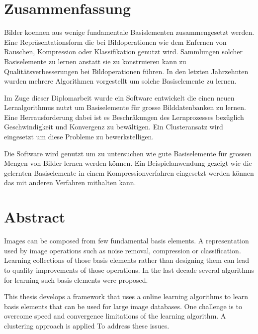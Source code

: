 \newpage
{}
{}
\chapter*{Zusammenfassung}
\thispagestyle{empty}

Bilder koennen aus wenige fundamentale Basislementen zusammengesetzt werden.
Eine Repr\"asentationsform die bei Bildoperationen wie dem
Enfernen von Rauschen, Kompression oder Klassifikation genutzt wird.
Sammlungen solcher Basiselemente zu lernen anstatt sie zu konstruieren kann
zu Qualit\"{a}tsverbesserungen bei Bildoperationen f\"{u}hren. 
In den letzten Jahrzehnten wurden mehrere Algorithmen vorgestellt um solche 
Basiselemente zu lernen.

Im Zuge dieser Diplomarbeit wurde ein Software entwickelt die einen neuen
Lernalgorithmus nutzt um Basiselemente f\"ur grosse Bilddatenbanken
zu lernen. Eine Herrausforderung dabei ist es Beschr\"{a}kungen des
Lernprozesses bez\"{u}glich Geschwindigkeit und Konvergenz zu bew\"altigen. Ein
Clusteransatz wird eingesetzt um diese Probleme zu bewerkstelligen.

Die Software wird genutzt um zu untersuchen wie gute
Basiselemente f\"{u}r grossen Mengen von Bilder lernen werden k\"{o}nnen.
Ein Beispielanwendung gezeigt wie die gelernten Basiselemente in einem
Kompressionverfahren eingesetzt werden k\"{o}nnen das mit anderen Verfahren
mithalten kann.

\newpage
{}
{}
\chapter*{Abstract}
\thispagestyle{empty}

Images can be composed from few fundamental basis elements. 
A representation used by image operations such as noise removal,
compression or classification. Learning collections of those basis elements
rather than designing them can lead to quality improvements of those
operations. In the last decade several algorithms for learning such basis
elements were proposed.

This thesis develops a framework that uses a online learning
algorithms to learn basis elements that can be used for large image
databases. One challenge is to overcome speed and convergence limitations of the
learning algorithm. A clustering approach is applied To address these issues. 

